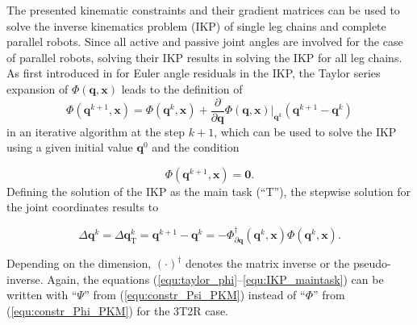 \documentclass[robotics,article,accept,moreauthors,pdftex]{Definitions/mdpi}
\newcommand{\bm}[1]{\boldsymbol{#1}}
\let\Phi\varPhi
\let\Psi\varPsi
\begin{document}
The presented kinematic constraints and their gradient matrices can be used to solve the inverse kinematics problem (IKP) of single leg chains and complete parallel robots.
Since all active and passive joint angles are involved for the case of parallel robots, solving their IKP results in solving the IKP for all leg chains.
As first introduced in \cite{GoldenbergBenFen1985} for Euler angle residuals in the IKP, the Taylor series expansion of $\bm{\Phi}(\bm{q},\bm{x})$ leads to the definition of
\vspace{-0.4cm} %
%
\begin{equation}
\bm{\Phi}(\bm{q}^{k+1},\bm{x}) = 
\bm{\Phi}(\bm{q}^{k},\bm{x})
+
\frac{\partial}{\partial \bm{q}} \bm{\Phi}(\bm{q},\bm{x}) \biggr\rvert_{\bm{q}^k} (\bm{q}^{k+1} - \bm{q}^k)
\label{equ:taylor_phi}
\end{equation}
%
in an iterative algorithm at the step $k+1$, which can be used to solve the IKP using a given initial value $\bm{q}^{0}$ and the condition
\vspace{-0.6cm} %

\begin{equation}
\bm{\Phi}(\bm{q}^{k+1},\bm{x})=\bm{0}.
\label{equ:taylor_phi_nextstepzero}
\end{equation}
%
%
Defining the solution of the IKP as the main task (``T''), the step\deleted[id=Sp]{-}wise solution for the joint coordinates results to
\vspace{-0.5cm} %

\begin{equation}
{\Delta}\bm{q}^{k}
=
{\Delta}\bm{q}_{\mathrm{T}}^k
=
\bm{q}^{k+1} - \bm{q}^k
=
-\bm{\Phi}_{\partial\bm{q}}^{\dagger}(\bm{q}^k,\bm{x}) \bm{\Phi}(\bm{q}^k,\bm{x}).
\label{equ:IKP_maintask}
\end{equation}
%

Depending on the dimension, $(\cdot)^\dagger$ denotes the matrix inverse or the pseudo-inverse.
Again, the equations (\ref{equ:taylor_phi}--\ref{equ:IKP_maintask}) can be written with ``$\bm{\Psi}$'' from (\ref{equ:constr_Psi_PKM}) instead of ``$\bm{\Phi}$'' from (\ref{equ:constr_Phi_PKM}) for the 3T2R case.
\end{document}
